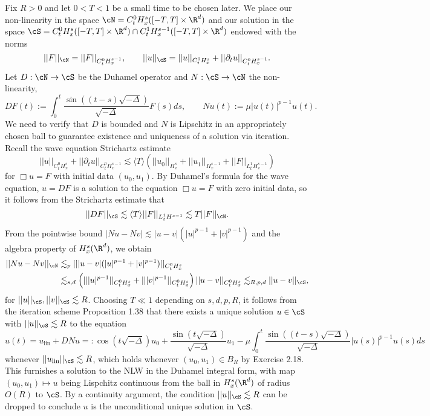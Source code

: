 \begin{solution}
	Fix $R > 0$ and let $0 < T < 1$ be a small time to be chosen later. We place our non-linearity in the space $\cN = C^0_t H^{s}_x ([-T, T] \times \R^d)$ and our solution in the space $\cS  = C^0_t H^s_x ([-T, T] \times \R^d) \cap C^1_t H^{s - 1}_x ([-T, T] \times \R^d)$ endowed with the norms
		\[ ||F||_{\cN} = ||F||_{C^0_t H^{s - 1}_x}, \qquad||u||_{\cS} =  ||u||_{C^0_t H^s_x} + ||\partial_t u||_{C^0_t H^{s - 1}_x}. \]
	Let $D: \cN \to \cS$ be the Duhamel operator and $N : \cS \to \cN$ the non-linearity, 
		\[ DF(t) := \int_0^t \frac{\sin((t - s) \sqrt{- \Delta})}{\sqrt{-\Delta}} F(s) ds, \qquad N u(t) := \mu |u(t)|^{p - 1} u(t).  \]	
	We need to verify that $D$ is bounded and $N$ is Lipschitz in an appropriately chosen ball to guarantee existence and uniqueness of a solution via iteration. Recall the wave equation Strichartz estimate
		\[ ||u||_{C^0_t H^s_x} + ||\partial_t u||_{C^0_t H^{s - 1}_x} \lesssim \langle T \rangle \left(||u_0||_{H^s_x} + ||u_1||_{H^{s - 1}_x} + ||F||_{L^1_t H^{s - 1}_x }\right) \]	
	for $\Box u = F$ with initial data $(u_0, u_1)$. By Duhamel's formula for the wave equation, $u = DF$ is a solution to the equation $\Box u = F$ with zero initial data, so it follows from the Strichartz estimate that  
		\[ || DF||_\cS \lesssim \langle T \rangle ||F||_{L^1_t H^{s - 1}} \lesssim T || F||_{\cN}. \] 
	From the pointwise bound $|Nu - Nv| \lesssim |u - v| (|u|^{p - 1} + |v|^{p - 1})$ and the algebra property of $H^s_x (\R^d)$, we obtain
		\begin{align*}
			 || Nu - Nv||_{\cN} 
			 	&\lesssim_p || |u - v| (|u|^{p - 1} + |v|^{p - 1}) ||_{C^0_t H^s_x}
			 	\\
			 	& \lesssim_{s,d} \left(|||u|^{p - 1}||_{C^0_t H^s_x} + |||v|^{p - 1}||_{C^0_t H^s_x}\right) ||u - v||_{C^0_t H^s_x} \lesssim_{R,p,d} ||u - v||_\cS,
		\end{align*}	 
	for $||u||_\cS, ||v||_\cS \lesssim R$. Choosing $T \ll 1$ depending on $s, d, p , R$, it follows from the iteration scheme Proposition 1.38 that there exists a unique solution $u \in \cS$ with $||u||_\cS \lesssim R$ to the equation 
			\[ u(t) = u_{\text{lin}} + DN u =: \cos (t \sqrt{-\Delta}) u_0 + \frac{\sin(t \sqrt{-\Delta})}{\sqrt{-\Delta}} u_1 - \mu \int_0^t \frac{\sin((t - s) \sqrt{- \Delta})}{\sqrt{-\Delta}} |u(s)|^{p - 1} u(s) ds  \]
	whenever $||u_{\text{lin}}||_\cS \lesssim R$, which holds whenever $(u_0, u_1) \in B_R$ by Exercise 2.18. This furnishes a solution to the NLW in the Duhamel integral form, with map $(u_0, u_1) \mapsto u$ being Lispchitz continuous from the ball in $H^s_x (\R^d)$ of radius $O(R)$ to $\cS$. By a continuity argument, the condition $||u||_\cS \lesssim R$ can be dropped to conclude $u$ is the unconditional unique solution in $\cS$.
\end{solution}


